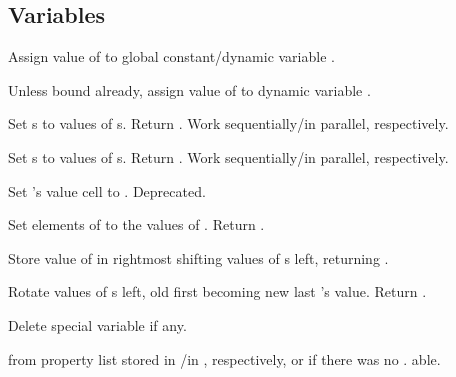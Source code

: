 \subsection{Variables}

\begin{LIST}{1cm}

  {
  Assign value of  to global constant/dynamic variable .
  }

  {
  Unless bound already, assign value of  to dynamic variable
  . 
  }

  {
  Set s to values of s. Return . Work sequentially/in parallel, respectively. 
  }

  {
  Set s to values of s. Return . Work sequentially/in parallel, respectively. 
  }

  {
  Set 's value cell to . Deprecated.
  }

  {
  Set elements of  to the values of
  . Return .
  }

  {
  Store value of  in rightmost  shifting values of
  s left, returning . 
  }

  {
  Rotate values of s left, old first becoming new last
  's value. Return \retval{\NIL}.
  }

  {
  Delete special variable  if any.
  }

  \label{:property_lists}
  {
   from property list stored in
  /in , respectively, or  if
  there was no . able.
  }


\end{LIST}
